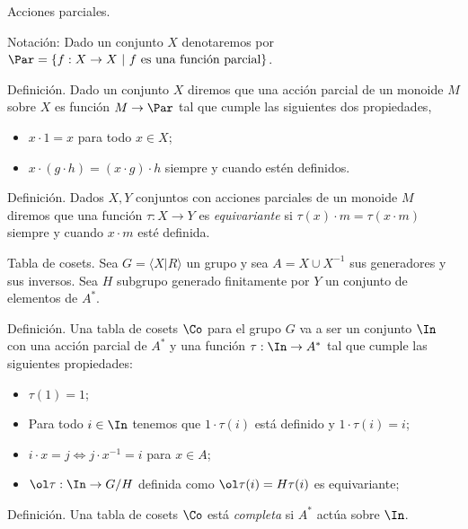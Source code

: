 \documentclass[aspectratio=169, 9pt]{beamer}
\begin{document}
\begin{frame}[fragile]{Acciones parciales.}
	
	
	\bigskip
	
	Notación: Dado un conjunto $X$ denotaremos por $\Par = \{ f: X \to X \ | \  f \ \text{es una función parcial} \}$.
	\pause
	\begin{alertblock}{Definición.}
		Dado un conjunto $X$ diremos que una acción parcial de un monoide $M$ sobre $X$ es función $M \to \Par$ tal que cumple las siguientes dos propiedades,
		\begin{itemize}
			\item $x \cdot 1 = x$ para todo $x \in X$;
			\item $x \cdot (g \cdot h) = (x \cdot g) \cdot h$ siempre y cuando estén definidos.
		\end{itemize} 
	\end{alertblock}
	\pause
	\begin{alertblock}{Definición.}
		Dados $X, Y$ conjuntos con acciones parciales de un monoide $M$ diremos que una función $\tau: X \to Y$ es \emph{equivariante} si $\tau (x) \cdot m = \tau (x \cdot m)$ siempre y cuando $x \cdot m$ esté definida.
	\end{alertblock}
	\pause
\end{frame}




\begin{frame}[fragile]{Tabla de cosets.}
Sea $G = \langle X | R \rangle$ un grupo \fp y sea $A = X \cup X^{-1}$ sus generadores y sus inversos.
Sea $H$ subgrupo generado finitamente por $Y$ un conjunto de elementos de $A^*$.
\pause
\begin{alertblock}{Definición.}
	Una tabla de cosets $\Co $ para el grupo $G$ va a ser un conjunto $\In$ con una acción parcial de $A^{*}$ y una función $\tau: \In \to A^*$ tal que cumple las siguientes propiedades:
	\begin{itemize}
		\item $\tau(1)  = 1$;
		\item Para todo $i \in \In$ tenemos que $1\cdot {\tau(i)}$ está definido y $1\cdot {\tau(i)} = i$;
		\item $i \cdot x = j \iff j \cdot x^{-1} = i$ para $x \in A$;
		\item $\ol \tau: \In \to G/H$ definida como $\ol \tau (i) = H \tau (i)$ es equivariante;
	\end{itemize}	
\end{alertblock}
\pause
%	


\begin{alertblock}{Definición.}
	Una tabla de cosets $\Co$ está \emph{completa} si $A^*$ actúa sobre $\In$.
\end{alertblock}

\end{frame}
\end{document}
